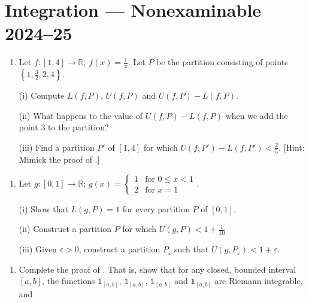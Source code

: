 \documentclass[letterpaper,10pt,english]{jupyterBook}
\begin{document}
\section{Integration — Non\sphinxhyphen{}examinable 2024–25}
\label{\detokenize{Problems:integration-non-examinable-2024-25}}\label{\detokenize{Problems:ch6prob}}\label{\detokenize{Problems:id66}}\begin{enumerate}
%
\setcounter{enumi}{65}
\item {} 
\sphinxAtStartPar
Let \(f:[1,4]\to\mathbb{R}\); \(\displaystyle f(x)=\frac{1}{x}\). Let \(P\) be the partition consisting of points \(\left\{1,\frac{3}{2},2,4\right\}\).

\sphinxAtStartPar
(i) Compute \(L(f,P)\), \(U(f,P)\) and \(U(f,P)-L(f,P)\).

\sphinxAtStartPar
(ii) What happens to the value of \(U(f,P)-L(f,P)\) when we add the point \(3\) to the partition?

\sphinxAtStartPar
(iii) Find a partition \(P'\) of \([1,4]\) for which \(U(f,P')-L(f,P')<\frac{2}{5}\). {[}Hint: Mimick the proof of .{]}

\end{enumerate}
\label{\detokenize{Problems:id67}}\begin{enumerate}
%
\setcounter{enumi}{66}
\item {} 
\sphinxAtStartPar
Let \(g:[0,1]\to\mathbb{R}\); \(\displaystyle g(x)=\left\{\begin{array}{cc} 1 & \text{for } 0\leq x<1 \\ 2 &\text{for } x=1 \end{array}\right.\).

\sphinxAtStartPar
(i) Show that \(L(g,P)=1\) for every partition \(P\) of \([0,1]\).

\sphinxAtStartPar
(ii) Construct a partition \(P\) for which \(U(g,P)<1+\frac{1}{10}\)

\sphinxAtStartPar
(iii) Given \(\varepsilon>0\), construct a partition \(P_\varepsilon\) such that \(U(g,P_\varepsilon)<1+\varepsilon\).

\end{enumerate}
\label{\detokenize{Problems:id68}}\begin{enumerate}
%
\setcounter{enumi}{67}
\item {} 
\sphinxAtStartPar
Complete the proof of . That is, show that for any closed, bounded interval \([a,b]\), the functions \(\mathbb{1}_{[a,b]}\), \(\mathbb{1}_{[a,b]}\), \(\mathbb{1}_{[a,b]}\) and \(\mathbb{1}_{[a,b]}\) are Riemann integrable, and

\end{enumerate}
\end{document}
